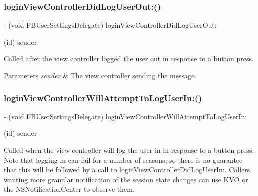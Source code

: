 \subsubsection{\texorpdfstring{login\+View\+Controller\+Did\+Log\+User\+Out\+:()}{loginViewControllerDidLogUserOut:()}\hspace{0.1cm}{\footnotesize\ttfamily [5/5]}}
{\footnotesize\ttfamily -\/ (void F\+B\+User\+Settings\+Delegate) login\+View\+Controller\+Did\+Log\+User\+Out\+: \begin{DoxyParamCaption}\item[{(id)}]{sender }\end{DoxyParamCaption}\hspace{0.3cm}{\ttfamily [optional]}}

Called after the view controller logged the user out in response to a button press.


\begin{DoxyParams}{Parameters}
{\em sender} & The view controller sending the message. \\
\hline
\end{DoxyParams}
\mbox{\label{protocolFBUserSettingsDelegate_01-p_a29fe822340933959a1b01785c50b7c4b}} 
\subsubsection{\texorpdfstring{login\+View\+Controller\+Will\+Attempt\+To\+Log\+User\+In\+:()}{loginViewControllerWillAttemptToLogUserIn:()}\hspace{0.1cm}{\footnotesize\ttfamily [1/5]}}
{\footnotesize\ttfamily -\/ (void F\+B\+User\+Settings\+Delegate) login\+View\+Controller\+Will\+Attempt\+To\+Log\+User\+In\+: \begin{DoxyParamCaption}\item[{(id)}]{sender }\end{DoxyParamCaption}\hspace{0.3cm}{\ttfamily [optional]}}

Called when the view controller will log the user in in response to a button press. Note that logging in can fail for a number of reasons, so there is no guarantee that this will be followed by a call to login\+View\+Controller\+Did\+Log\+User\+In\+:. Callers wanting more granular notification of the session state changes can use K\+VO or the N\+S\+Notification\+Center to observe them.



